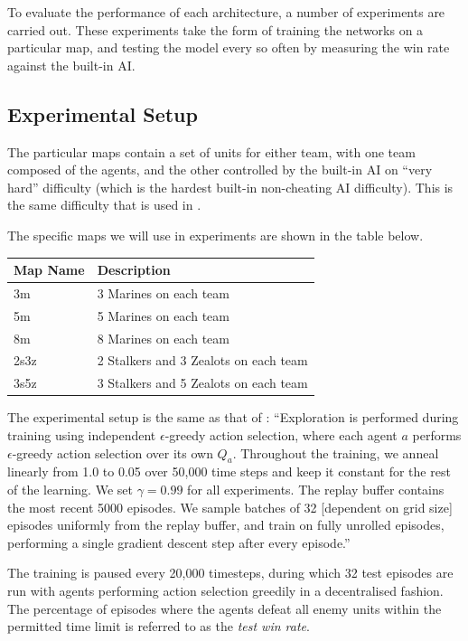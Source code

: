 To evaluate the performance of each architecture, a number of experiments are carried out. These experiments take the form of training the networks on a particular map, and testing the model every so often by measuring the win rate against the built-in AI.

\subsection{Experimental Setup}

The particular maps contain a set of units for either team, with one team composed of the agents, and the other controlled by the built-in AI on ``very hard'' difficulty (which is the hardest built-in non-cheating AI difficulty). This is the same difficulty that is used in \cite{smac}.

The specific maps we will use in experiments are shown in the table below.

\vspace{3mm}
\begin{tabular}{ |p{2.5cm}||p{6.6cm}|  }
 \hline
 \centering Map Name& \centering Description\tabularnewline
 \hline
 \centering 3m   & 3 Marines on each team\\
 \hline
 \centering 5m   & 5 Marines on each team\\
 \hline
 \centering 8m   & 8 Marines on each team\\
 \hline
 \centering 2s3z   & 2 Stalkers and 3 Zealots on each team\\
 \hline
 \centering 3s5z   & 3 Stalkers and 5 Zealots on each team\\
 \hline
 
\end{tabular}
\vspace{3mm}

The experimental setup is the same as that of \cite{smac}: ``Exploration is performed during training using independent $\epsilon$-greedy action selection, where each agent $a$ performs $\epsilon$-greedy action selection over its own $Q_a$. Throughout the training, we anneal linearly from 1.0 to 0.05 over 50,000 time steps and keep it constant for the rest of the learning. We set $\gamma= 0.99$ for all experiments. The replay buffer contains the most recent 5000 episodes.  We sample batches of 32 [dependent on grid size] episodes uniformly from the replay buffer, and train on fully unrolled episodes, performing a single gradient descent step after every episode.'' 

The training is paused every 20,000 timesteps, during which 32 test episodes are run with agents performing action selection greedily in a decentralised fashion. The percentage of episodes where the agents defeat all enemy units within the permitted time limit is referred to as the \textit{test win rate}.

